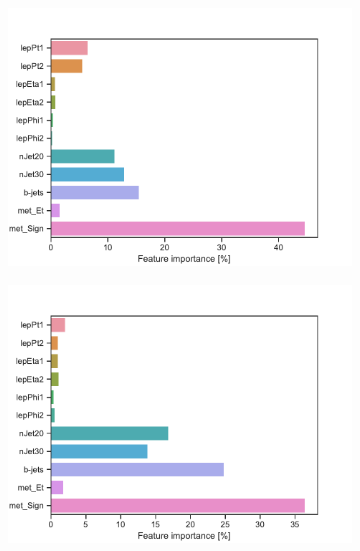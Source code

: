 \begin{figure}[H]
\begin{subfigure}[t!]{0.49\textwidth}
        \caption{}
        \label{fig:featSlepsnuLow}
    \end{subfigure}
    \begin{subfigure}[t!]{0.49\textwidth}
        \includegraphics[width = \textwidth]{Figures/WW/BDT/Low_level/High/featureImportance.pdf}
        \caption{}
        \label{fig:featWWLow}
    \end{subfigure}
    \begin{subfigure}[t!]{0.49\textwidth}
        \includegraphics[width = \textwidth]{Figures/Mono_Z/ML/BDT/Low_level/High/featureImportance.pdf}
        \caption{}
        \label{fig:featMonoZLow}
    \end{subfigure}
    \caption{}
    \label{fig:resExample}
\end{figure}


